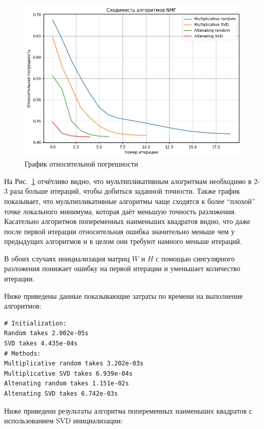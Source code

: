 \begin{figure}[h]
  \includegraphics[width=\linewidth]{assets/Graph1.png}
  \caption{График относительной погрешности}
  \label{fig:relativeApproximationError}
\end{figure}

На Рис.~\ref{fig:relativeApproximationError} отчётливо видно, что мультипликативным алогритмам необходимо в 2-3 раза больше итераций, чтобы добиться заданной точности. Также график показывает, что мультипликативные алгоритмы чаще сходятся к более ``плохой'' точке локального минимума, которая даёт меньшую точность разложения. Касательно алгоритмов попеременных наименьших квадратов видно, что даже после первой итерации относительная ошибка значительно меньше чем у предыдущих алгоритмов и в целом они требуют намного меньше итераций.

В обоих случаях инициализация матриц $W$ и $H$ с помощью сингулярного разложения понижает ошибку на первой итерации и уменьшает количество итерации.


\newpage


Ниже приведены данные показывающие затраты по времени на выполнение алгоритмов:

\verbatimfont{\small}
\begin{verbatim}
# Initialization:
Random takes 2.002e-05s
SVD takes 4.435e-04s
# Methods:
Multiplicative random takes 3.202e-03s
Multiplicative SVD takes 6.939e-04s
Altenating random takes 1.151e-02s
Altenating SVD takes 6.742e-03s
\end{verbatim}

Ниже приведени результаты алгоритма попеременных наименьших квадратов с использованием SVD инициализации:

